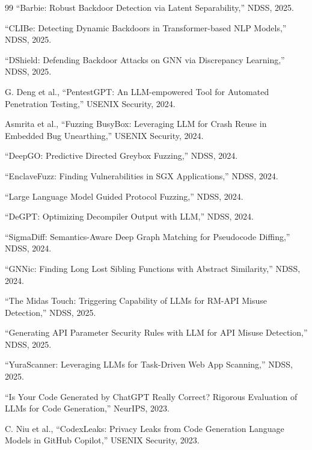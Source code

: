 \documentclass[11pt,a4paper,onecolumn]{article}
\begin{document}
\begin{thebibliography}{99}
``Barbie: Robust Backdoor Detection via Latent Separability,'' NDSS, 2025.

``CLIBe: Detecting Dynamic Backdoors in Transformer-based NLP Models,'' NDSS, 2025.

``DShield: Defending Backdoor Attacks on GNN via Discrepancy Learning,'' NDSS, 2025.


G. Deng et al., ``PentestGPT: An LLM-empowered Tool for Automated Penetration Testing,'' USENIX Security, 2024.

Asmrita et al., ``Fuzzing BusyBox: Leveraging LLM for Crash Reuse in Embedded Bug Unearthing,'' USENIX Security, 2024.

``DeepGO: Predictive Directed Greybox Fuzzing,'' NDSS, 2024.

``EnclaveFuzz: Finding Vulnerabilities in SGX Applications,'' NDSS, 2024.

``Large Language Model Guided Protocol Fuzzing,'' NDSS, 2024.

``DeGPT: Optimizing Decompiler Output with LLM,'' NDSS, 2024.

``SigmaDiff: Semantics-Aware Deep Graph Matching for Pseudocode Diffing,'' NDSS, 2024.

``GNNic: Finding Long Lost Sibling Functions with Abstract Similarity,'' NDSS, 2024.

``The Midas Touch: Triggering Capability of LLMs for RM-API Misuse Detection,'' NDSS, 2025.

``Generating API Parameter Security Rules with LLM for API Misuse Detection,'' NDSS, 2025.

``YuraScanner: Leveraging LLMs for Task-Driven Web App Scanning,'' NDSS, 2025.


``Is Your Code Generated by ChatGPT Really Correct? Rigorous Evaluation of LLMs for Code Generation,'' NeurIPS, 2023.

C. Niu et al., ``CodexLeaks: Privacy Leaks from Code Generation Language Models in GitHub Copilot,'' USENIX Security, 2023.


\end{thebibliography}
\end{document}
